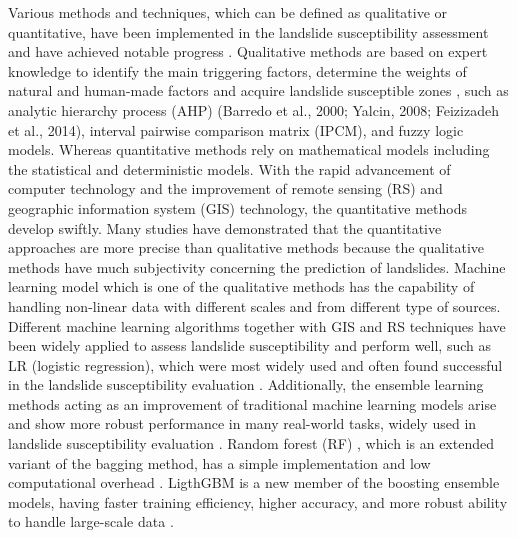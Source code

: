 \documentclass[a4paper,fleqn]{cas-sc}
\begin{document}
Various methods and techniques, which can be defined as qualitative or quantitative, have been implemented in the landslide susceptibility assessment and have achieved notable progress \citep{Fang2020IJoGIS,Guzzetti_1999_Geomorphology,Bui2020Catena}. 
Qualitative methods are based on expert knowledge to identify the main triggering factors, determine the weights of natural and human-made factors and acquire landslide susceptible zones \citep{Aditian2018Geomorphology}, such as analytic hierarchy process (AHP) (Barredo et al., 2000; Yalcin, 2008; Feizizadeh et al., 2014)\citep{Barredo2000IJoAEOaG,Yalcin2008Catena}, interval pairwise comparison matrix (IPCM)\citep{Ghorbanzadeh2019RemoteSensing}, and fuzzy logic models\citep{Aksoy2012Computers&Geosciences,Anbalagan2015GeoenvironmentalDisasters,Shahabi2015EnvironmentalEarthSciences,Roy2019RemoteSensingApplicationsSocietyandEnvironment}. 
Whereas quantitative methods rely on mathematical models including the statistical and deterministic models\citep{Abuzied2016JoMS, Reichenbach2018ER,Fang2020IJoGIS}. 
With the rapid advancement of computer technology and the improvement of remote sensing (RS) and geographic information system (GIS) technology, the quantitative methods develop swiftly. 
Many studies have demonstrated that the quantitative approaches are more precise than qualitative methods because the qualitative methods have much subjectivity concerning the prediction of landslides\citep{Aditian2018Geomorphology, Bui2020Catena}. 
Machine learning model which is one of the qualitative methods has the capability of handling non-linear data with different scales and from different type of sources\citep{Bui2020Catena}. 
Different machine learning algorithms together with GIS and RS techniques have been widely applied to assess landslide susceptibility and perform well, such as LR (logistic regression), which were most widely used and often found successful in the landslide susceptibility evaluation \citep{Ayalew2005Geomorphology,Eeckhaut2006Geomorphology,Bai2010Geomorphology,Akgun2012Landslides,Sevgen2019S,Dag2020EES}. 
Additionally, the ensemble learning methods acting as an improvement of traditional machine learning models arise and show more robust performance in many real-world tasks, widely used in landslide susceptibility evaluation \citep{Althuwaynee2014Landslides,Napoli2020Landslides,Hong2020SoTTE,Saha2021SoTTE}. 
Random forest (RF) \citep{Breiman2001}, which is an extended variant of the bagging method, has a simple implementation and low computational overhead \citep{Youssef2015Landslides, Kim2017GI}. 
LigthGBM is a new member of the boosting ensemble models, having faster training efficiency, higher accuracy, and more robust ability to handle large-scale data \citep{Song2018}. 
\end{document}
